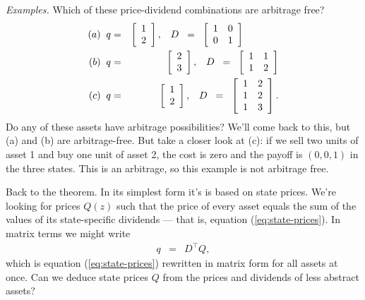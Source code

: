 \documentclass[11pt]{article}
\begin{document}
{\it Examples.\/}
Which of these price-dividend combinations are arbitrage free?
\begin{eqnarray*}
  (a) \;\;  q &=& \left[
            \begin{array}{c}
             1 \\ 2
            \end{array}
          \right], \;\;\;
        D \;\;=\;\;
            \left[
            \begin{array}{cc}
             1 & 0 \\ 0 & 1
            \end{array}
          \right]    \hspace*{0.5in}  \\
  (b) \;\;  q &=& \left[
            \begin{array}{c}
             2 \\ 3
            \end{array}
          \right], \;\;\;
        D \;\;=\;\;
            \left[
            \begin{array}{cc}
             1 & 1 \\ 1 & 2
            \end{array}
          \right]      \\
  (c) \;\;  q &=& \left[
            \begin{array}{c}
             1 \\ 2
            \end{array}
          \right], \;\;\;
        D \;\;=\;\;
            \left[
            \begin{array}{cc}
             1 & 2 \\ 1 & 2 \\ 1 & 3
            \end{array}
          \right]        .
\end{eqnarray*}
Do any of these assets have arbitrage possibilities?
We'll come back to this, but (a) and (b) are arbitrage-free.
But take a closer look at (c):
if we sell two units of asset 1 and buy one unit of asset 2,
the cost is zero and the payoff is $(0, 0, 1)$ in the three states.
This is an arbitrage, so this example is not arbitrage free.

Back to the theorem.
In its simplest form it's is based on state prices.
We're looking for prices $Q(z)$ %
such that the price of every asset equals the sum of the values
of its state-specific dividends ---
that is, equation (\ref{eq:state-prices}).
In matrix terms we might write
\begin{eqnarray}
    q &=&  D^\top Q,
    \label{eq:state-prices-matrix}
\end{eqnarray}
which is equation (\ref{eq:state-prices}) rewritten in matrix form
for all assets at once.
Can we deduce state prices $Q$ from the prices and dividends of
less abstract assets?
\end{document}
